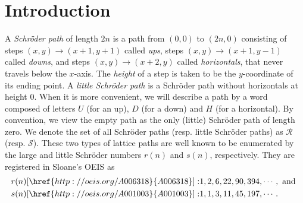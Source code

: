 \documentclass[11pt,reqno]{amsart}
\numberwithin{equation}{section}
\theoremstyle{plain}
\theoremstyle{definition}
\newcommand{\R}{\mathcal{R}}
\newcommand{\s}{\mathcal{S}}
\begin{document}
\section{Introduction}\label{sec1: intro}

A \emph{Schr\"oder path} of length $2n$ is a path from $(0,0)$ to $(2n,0)$ consisting of steps $(x,y)\rightarrow(x+1,y+1)$ called \emph{ups}, steps $(x,y)\rightarrow(x+1,y-1)$ called \emph{downs}, and steps $(x,y)\rightarrow(x+2,y)$ called \emph{horizontals}, that never travels below the $x$-axis. The \emph{height} of a step is taken to be the $y$-coordinate of its ending point. A \emph{little Schr\"oder path} is a Schr\"oder path without horizontals at height $0$. When it is more convenient, we will describe a path by a word composed of letters $U$ (for an up), $D$ (for a down) and $H$ (for a horizontal). By convention, we view the empty path as the only (little) Schr\"oder path of length zero. We denote the set of all Schr\"oder paths (resp. little Schr\"oder paths) as $\R$ (resp. $\s$). These two types of lattice paths are well known to be enumerated by the large and little Schr\"oder numbers $r(n)$ and $s(n)$, respectively. They are registered in Sloane's OEIS \cite{oeis} as
\begin{align*}
r(n) [\href{http://oeis.org/A006318}{A006318}]:& 1,2,6,22,90,394,\cdots, \text{ and } \\
s(n) [\href{http://oeis.org/A001003}{A001003}]:& 1,1,3,11,45,197,\cdots.
\end{align*}

\end{document}
